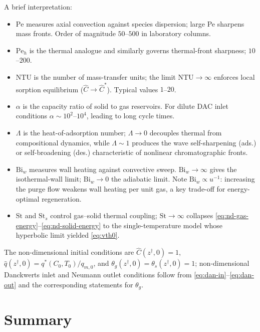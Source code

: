 \documentclass[a4paper,11pt]{amsart}
\theoremstyle{definition}
\begin{document}
A brief interpretation:
\begin{itemize}
\item $\mathrm{Pe}$ measures axial convection against species dispersion; large Pe sharpens mass fronts. Order of magnitude $50$--$500$ in laboratory columns.
\item $\mathrm{Pe}_h$ is the thermal analogue and similarly governs thermal-front sharpness; $10$--$200$.
\item $\mathrm{NTU}$ is the number of mass-transfer units; the limit $\mathrm{NTU}\to\infty$ enforces local sorption equilibrium ($\hat C\to\hat C^\ast$). Typical values $1$--$20$.
\item $\alpha$ is the capacity ratio of solid to gas reservoirs. For dilute DAC inlet conditions $\alpha\sim 10^2$--$10^4$, leading to long cycle times.
\item $\Lambda$ is the heat-of-adsorption number; $\Lambda\to 0$ decouples thermal from compositional dynamics, while $\Lambda\sim 1$ produces the wave self-sharpening (ads.) or self-broadening (des.) characteristic of nonlinear chromatographic fronts.
\item $\mathrm{Bi}_w$ measures wall heating against convective sweep. $\mathrm{Bi}_w\to\infty$ gives the isothermal-wall limit; $\mathrm{Bi}_w\to 0$ the adiabatic limit. Note $\mathrm{Bi}_w\propto u^{-1}$: increasing the purge flow weakens wall heating per unit gas, a key trade-off for energy-optimal regeneration.
\item $\mathrm{St}$ and $\mathrm{St}_s$ control gas--solid thermal coupling; $\mathrm{St}\to\infty$ collapses \eqref{eq:nd-gas-energy}--\eqref{eq:nd-solid-energy} to the single-temperature model whose hyperbolic limit yielded \eqref{eq:vth0}.
\end{itemize}

The non-dimensional initial conditions are $\hat C(z^\dagger,0)=1$, $\hat q(z^\dagger,0)=q^\ast(C_0,T_0)/q_{m,0}$, and $\theta_g(z^\dagger,0)=\theta_s(z^\dagger,0)=1$; non-dimensional Danckwerts inlet and Neumann outlet conditions follow from \eqref{eq:dan-in}--\eqref{eq:dan-out} and the corresponding statements for $\theta_g$.

\section{Summary}
\end{document}
